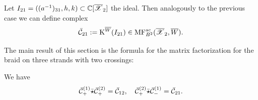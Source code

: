 Let $I_{21}=((a^{-1})_{31},h,k)\subset \mathbb{C}[\overline{\mathscr{X}}_2]$ the ideal.
Then analogously to the previous case we can define complex
$$ \bar{\mathcal{C}}_{21}:=\mathrm{K}^{\overline{W}}(I_{21})\in \mathrm{MF}^{sc}_{B^2}(\overline{\mathscr{X}}_2,\overline{W}).$$

The main result of this section is the formula for the matrix factorization for the braid on three strands with two crossings:
\begin{lemma} \label{lem: two cross}We have
$$ \bar{\mathcal{C}}^{(1)}_+\bar{\star}\bar{\mathcal{C}}^{(2)}_+=\bar{\mathcal{C}}_{12},\quad \bar{\mathcal{C}}^{(2)}_+\bar{\star}\bar{\mathcal{C}}^{(1)}_-=\bar{\mathcal{C}}_{21}.$$
\end{lemma}


